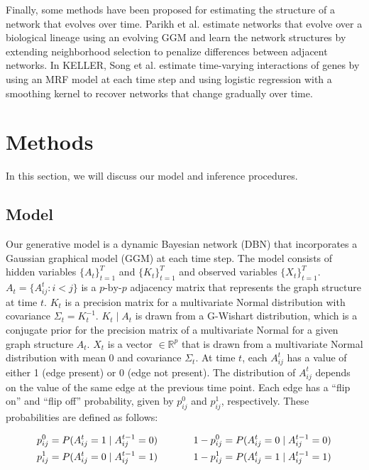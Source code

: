 \documentclass{article}
\begin{document}
Finally, some methods have been proposed for estimating the structure of a network that evolves over time. Parikh et al. \cite{parikh2011treegl} estimate networks that evolve over a biological lineage using an evolving GGM and learn the network structures by extending neighborhood selection to penalize differences between adjacent networks. In KELLER, Song et al. \cite{song2009keller} estimate time-varying interactions of genes by using an MRF model at each time step and using logistic regression with a smoothing kernel to recover networks that change gradually over time.

\section{Methods}
\label{sec:methods}

In this section, we will discuss our model and inference procedures.

\subsection{Model}
\label{sec:model}
Our generative model is a dynamic Bayesian network (DBN) that incorporates a Gaussian graphical model (GGM) at each time step. The model consists of hidden variables $\{A_t\}_{t=1}^T$ and $\{K_t\}_{t=1}^T$ and observed variables $\{X_t\}_{t=1}^T$. $A_t = \{ A_{ij}^t : i < j \}$ is a $p\text{-by-}p$ adjacency matrix that represents the graph structure at time $t$. $K_t$ is a precision matrix for a multivariate Normal distribution with covariance $\Sigma_t = K_t^{-1}$. $K_t \mid A_t$ is drawn from a G-Wishart distribution, which is a conjugate prior for the precision matrix of a multivariate Normal for a given graph structure $A_{t}$. $X_t$ is a vector $\in \mathbb{R}^p$ that is drawn from a multivariate Normal distribution with mean $0$ and covariance $\Sigma_t$. At time $t$, each $A_{ij}^t$ has a value of either 1 (edge present) or 0 (edge not present). The distribution of $A_{ij}^t$ depends on the value of the same edge at the previous time point. Each edge has a ``flip on'' and ``flip off'' probability, given by $p_{ij}^0$ and $p_{ij}^1$, respectively. These probabilities are defined as follows: 

\begin{align*}
p_{ij}^0 = P(A_{ij}^t = 1 \mid A_{ij}^{t-1} = 0) \hspace{.5in} 1 - p_{ij}^0 = P(A_{ij}^t = 0 \mid A_{ij}^{t-1} = 0) \\
p_{ij}^1 = P(A_{ij}^t = 0 \mid A_{ij}^{t-1} = 1) \hspace{.5in} 1 - p_{ij}^1 = P(A_{ij}^t = 1 \mid A_{ij}^{t-1} = 1)
\end{align*}
\end{document}
